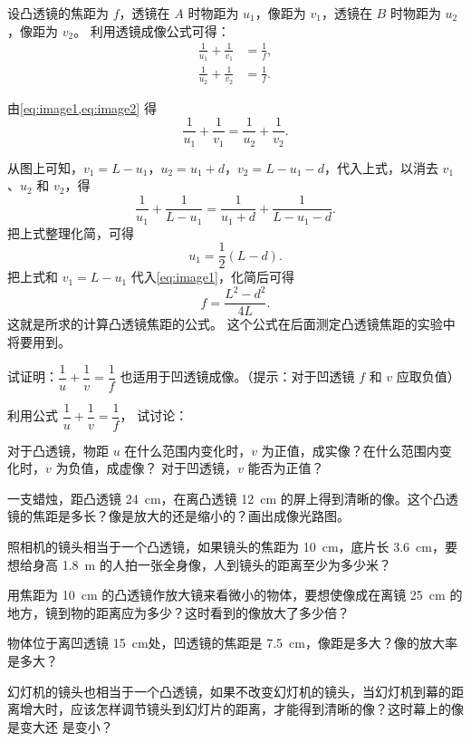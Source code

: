 \begin{solution}
设凸透镜的焦距为 $f$，透镜在 $A$ 时物距为 $u_1$，像距为 $v_1$，透镜在 $B$ 时物距为 $u_2$，像距为 $v_2$。
利用透镜成像公式可得：
\begin{align}
\label{eq:image1}\frac{1}{u_1}+\frac{1}{v_1}&=\frac{1}{f},\\
\label{eq:image2}\frac{1}{u_2}+\frac{1}{v_2}&=\frac{1}{f}.
\end{align}

由\cref{eq:image1,eq:image2} 得
\[\frac{1}{u_1}+\frac{1}{v_1}=\frac{1}{u_2}+\frac{1}{v_2}. \]
    
从图上可知，$v_1=L-u_1$，$u_2=u_1+d$，$v_2=L-u_1-d$，代入上式，以消去 $v_1$、$u_2$ 和 $v_2$，得
\[\frac{1}{u_1}+\frac{1}{L-u_1}=\frac{1}{u_1+d}+\frac{1}{L-u_1-d}. \]
把上式整理化简，可得
\[u_1=\frac{1}{2}(L-d).\]
把上式和 $v_1=L-u_1$ 代入\cref{eq:image1}，化简后可得
\[f=\frac{L^2-d^2}{4L}.\]
这就是所求的计算凸透镜焦距的公式。
这个公式在后面测定凸透镜焦距的实验中将要用到。
\end{solution}


\begin{Practice}
\begin{question}
  \item 试证明：$\dfrac{1}{u}+\dfrac{1}{v}=\dfrac{1}{f}$ 也适用于凹透镜成像。（提示：对于凹透镜 $f$ 和 $v$ 应取负值）
  \item  利用公式
  $\dfrac{1}{u}+\dfrac{1}{v}=\dfrac{1}{f}$，
  试讨论：
  \begin{tasks}
    \task 对于凸透镜，物距 $u$ 在什么范围内变化时，$v$ 为正值，成实像？在什么范围内变化时，$v$ 为负值，成虚像？
    \task 对于凹透镜，$v$ 能否为正值？
  \end{tasks}
  \item 一支蜡烛，距凸透镜 \qty{24}{cm}，在离凸透镜 \qty{12}{cm} 的屏上得到清晰的像。这个凸透镜的焦距是多长？像是放大的还是缩小的？画出成像光路图。
  \item 照相机的镜头相当于一个凸透镜，如果镜头的焦距为 \qty{10}{cm}，底片长 \qty{3.6}{cm}，要想给身高 \qty{1.8}{m} 的人拍一张全身像，人到镜头的距离至少为多少米？
  \item 用焦距为 \qty{10}{cm} 的凸透镜作放大镜来看微小的物体，要想使像成在离镜 \qty{25}{cm} 的地方，镜到物的距离应为多少？这时看到的像放大了多少倍？
  \item 物体位于离凹透镜 \qty{15}{cm}处，凹透镜的焦距是 \qty{7.5}{cm}，像距是多大？像的放大率是多大？
  \item 幻灯机的镜头也相当于一个凸透镜，如果不改变幻灯机的镜头，当幻灯机到幕的距离增大时，应该怎样调节镜头到幻灯片的距离，才能得到清晰的像？这时幕上的像是变大还
是变小？
\end{question}
\end{Practice}

